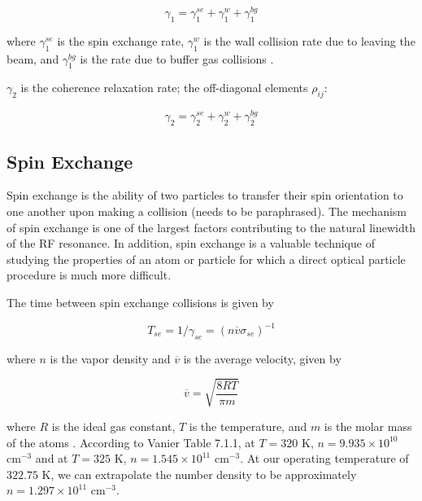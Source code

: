\begin{equation}
\gamma_1 = \gamma_1^{se} + \gamma_1^{w} + \gamma_1^{bg} 
\label{eqn:gamma1}
\end{equation}

where $\gamma_1^{se}$ is the spin exchange rate, $\gamma_1^{w}$ is the
wall collision rate due to leaving the beam, and $\gamma_1^{bg}$ is
the rate due to buffer gas collisions \cite{vanier}.

$\gamma_2$ is the coherence relaxation rate; the off-diagonal elements
$\rho_{ij}$:

\begin{equation}
\gamma_2 = \gamma_2^{se} + \gamma_2^{w} + \gamma_2^{bg}
\label{eqn:gamma2}
\end{equation}

\subsection{Spin Exchange}


Spin exchange is the ability of two particles to transfer their spin
orientation to one another upon making a collision (needs to be
paraphrased)\cite {bernheim}. The mechanism of spin exchange is one of
the largest factors contributing to the natural linewidth of the RF
resonance. In addition, spin exchange is a valuable technique of
studying the properties of an atom or particle for which a direct
optical particle procedure is much more difficult.

The time between spin exchange collisions is given by

\begin{equation}
T_{se} = 1/\gamma_{se} = (n\overline{v}\sigma_{se})^{-1}
\end{equation}

where $n$ is the vapor density and $\overline{v}$ is the average velocity, given by

\begin{equation}
\overline{v} = \sqrt{\frac{8RT}{\pi m}}
\end{equation}

where $R$ is the ideal gas constant, $T$ is the temperature, and $m$
is the molar mass of the atoms \cite{vanier}. According to Vanier
Table 7.1.1, at $T = 320$ K, $n = 9.935\times 10^{10}$ cm$^{-3}$ and
at $T = 325$ K, $n = 1.545\times 10^{11}$ cm$^{-3}$. At our operating
temperature of $322.75$ K, we can extrapolate the number density to be
approximately  $n = 1.297\times 10^{11}$ cm$^{-3}$. 

